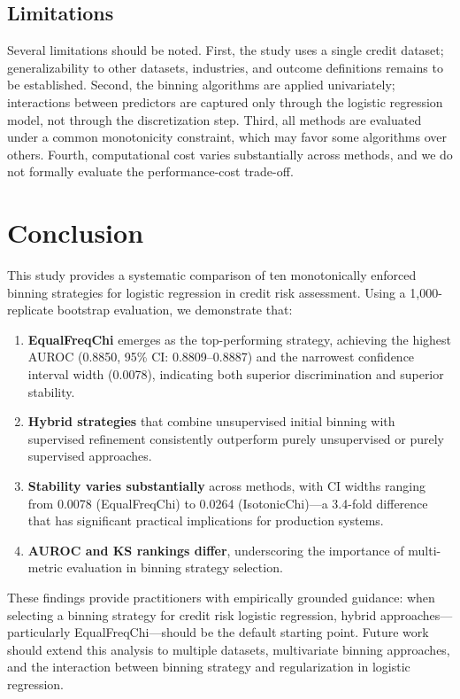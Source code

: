 \documentclass[11pt]{article}
\begin{document}
\subsection{Limitations}

Several limitations should be noted. First, the study uses a single credit dataset; generalizability to other datasets, industries, and outcome definitions remains to be established. Second, the binning algorithms are applied univariately; interactions between predictors are captured only through the logistic regression model, not through the discretization step. Third, all methods are evaluated under a common monotonicity constraint, which may favor some algorithms over others. Fourth, computational cost varies substantially across methods, and we do not formally evaluate the performance-cost trade-off.


\section{Conclusion}
\label{sec:conclusion}

This study provides a systematic comparison of ten monotonically enforced binning strategies for logistic regression in credit risk assessment. Using a 1{,}000-replicate bootstrap evaluation, we demonstrate that:

\begin{enumerate}[nosep]
    \item \textbf{EqualFreqChi} emerges as the top-performing strategy, achieving the highest AUROC (0.8850, 95\% CI: 0.8809--0.8887) and the narrowest confidence interval width (0.0078), indicating both superior discrimination and superior stability.
    \item \textbf{Hybrid strategies} that combine unsupervised initial binning with supervised refinement consistently outperform purely unsupervised or purely supervised approaches.
    \item \textbf{Stability varies substantially} across methods, with CI widths ranging from 0.0078 (EqualFreqChi) to 0.0264 (IsotonicChi)---a 3.4-fold difference that has significant practical implications for production systems.
    \item \textbf{AUROC and KS rankings differ}, underscoring the importance of multi-metric evaluation in binning strategy selection.
\end{enumerate}

These findings provide practitioners with empirically grounded guidance: when selecting a binning strategy for credit risk logistic regression, hybrid approaches---particularly EqualFreqChi---should be the default starting point. Future work should extend this analysis to multiple datasets, multivariate binning approaches, and the interaction between binning strategy and regularization in logistic regression.
\end{document}
